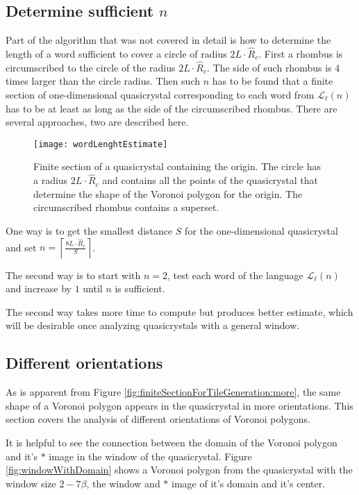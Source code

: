 \documentclass[text.tex]{subfiles}
\begin{document}
\subsection{Determine sufficient $n$}
Part of the algorithm that was not covered in detail is how to determine the length of a word sufficient to cover a circle of radius $2L\cdot\hat{R}_c$. First a rhombus is circumscribed to the circle of the radius $2L\cdot\hat{R}_c$. The side of such rhombus is $4$ times larger than the circle radius. Then such $n$ has to be found that a finite section of one-dimensional quasicrystal corresponding to each word from $\mathcal{L}_{\ell}(n)$ has to be at least as long as the side of the circumscribed rhombus. 
There are several approaches, two are described here. 

\begin{figure}[h]
\centering
\texttt{[image: wordLenghtEstimate]}
\caption{Finite section of a quasicrystal containing the origin. The circle has a radius $2L\cdot\hat{R}_c$ and contains all the points of the quasicrystal that determine the shape of the Voronoi polygon for the origin. The circumscribed rhombus contains a superset.}
\label{fig:wordLenghtEstimate}
\end{figure}

One way is to get the smallest distance $S$ for the one-dimensional quasicrystal and set $n = \left\lceil\frac{8L\cdot\hat{R}_c}{S}\right\rceil$. 

The second way is to start with $n=2$, test each word of the language $\mathcal{L}_{\ell}(n)$ and increase by $1$ until $n$ is sufficient. 

The second way takes more time to compute but produces better estimate, which will be desirable once analyzing quasicrystals with a general window.

\subsection{Different orientations}
As is apparent from Figure \ref{fig:finiteSectionForTileGeneration:more}, the same shape of a Voronoi polygon appears in the quasicrystal in more orientations. This section covers the analysis of different orientations of Voronoi polygons. 

It is helpful to see the connection between the domain of the Voronoi polygon and it's $\ast$ image in the window of the quasicrystal. Figure \ref{fig:windowWithDomain} shows a Voronoi polygon from the quasicrystal with the window size $2-7\beta$, the window and $\ast$ image of it's domain and it's center. 
\end{document}
